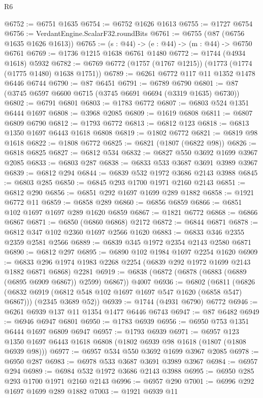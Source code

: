 \begin{lexlean}{R6}
\begin{coremodule}
@6752 := @6751 @1635
@6754 := @6752 @1626 @1613
@6755 := @1727 @6754
@6756 := VerdantEngine.ScalarF32.roundBits
@6761 := @6755 (@87 (@6756 @1635 @1626 @1613))
@6765 := (s : @44) -> (e : @44) -> (m : @44) -> @6750 @6761
@6769 := @1736 @1215 @1638 @6761 @1480
@6772 := @1744 (@4934 @1618) @5932
@6782 := @6769 @6772 (@1757 (@1767 @1215)) (@1773 (@1774 (@1775 @1480) @1638 @1751))
@6789 := @6261 @6772 @117 @11 @1352 @1478 @6446 @6744
@6790 := @87 @6451
@6791 := @6789 @6790
@6801 := @87 (@3745 @6597 @6600 @6715 (@3745 @6691 @6694 (@3319 @1635) @6730))
@6802 := @6791 @6801
@6803 := @1783 @6772
@6807 := @6803 @524 @1351 @6444 @1697
@6808 := @3968 @2085
@6809 := @1619 @6808
@6811 := @6807 @6809 @6790
@6812 := @1793 @6772
@6813 := @6812 @123
@6818 := @6813 @1350 @1697 @6443 @1618 @6808
@6819 := @1802 @6772
@6821 := @6819 @98 @1618
@6822 := @1808 @6772
@6825 := @6821 (@1807 (@6822 @98))
@6826 := @6818 @6825
@6827 := @6812 @534
@6832 := @6827 @550 @3692 @1699 @3967 @2085
@6833 := @6803 @287
@6838 := @6833 @533 @3687 @3691 @3989 @3967
@6839 := @6812 @294
@6844 := @6839 @532 @1972 @3686 @2143 @3988
@6845 := @6803 @285
@6850 := @6845 @293 @1700 @1971 @2160 @2143
@6851 := @6812 @290
@6856 := @6851 @292 @1697 @1699 @289 @1882
@6858 := @1921 @6772 @11
@6859 := @6858 @289
@6860 := @6856 @6859
@6866 := @6851 @102 @1697 @1697 @289 @1620 @6859
@6867 := @1821 @6772
@6868 := @6866 @6867
@6871 := @6850 (@6860 @6868) @2172
@6872 := @6844 @6871
@6878 := @6812 @347 @102 @2360 @1697 @2566 @1620
@6883 := @6833 @346 @2355 @2359 @2581 @2566
@6889 := @6839 @345 @1972 @2354 @2143 @2580 @6871
@6890 := @6812 @297
@6895 := @6890 @102 @1984 @1697 @2254 @1620
@6909 := @6833 @296 @1974 @1983 @2268 @2254 (@6839 @292 @1972 @1699 @2143 @1882 @6871 @6868) @2281
@6919 := @6838 (@6872 (@6878 (@6883 (@6889 (@6895 @6909 @6867)) @2599) @6867)) @4007
@6936 := @6802
    (@6811
      (@6826 (@6832 @6919 (@6812 @548 @102 @1697 @1697 @547 @1620 (@6858 @547) @6867)))
      (@2345 @3689 @52))
@6939 := @1744 (@4931 @6790) @6772
@6946 := @6261 @6939 @137 @11 @1354 @1477 @6446 @6743
@6947 := @87 @6482
@6949 := @6946 @6947 @6801
@6950 := @1783 @6939
@6956 := @6950 @753 @1351 @6444 @1697 @6809 @6947
@6957 := @1793 @6939
@6971 := @6957 @123 @1350 @1697 @6443 @1618 @6808 (@1802 @6939 @98 @1618 (@1807 (@1808 @6939 @98)))
@6977 := @6957 @534 @550 @3692 @1699 @3967 @2085
@6978 := @6950 @287
@6983 := @6978 @533 @3687 @3691 @3989 @3967
@6984 := @6957 @294
@6989 := @6984 @532 @1972 @3686 @2143 @3988
@6995 := @6950 @285 @293 @1700 @1971 @2160 @2143
@6996 := @6957 @290
@7001 := @6996 @292 @1697 @1699 @289 @1882
@7003 := @1921 @6939 @11

\end{coremodule}
\end{lexlean}
